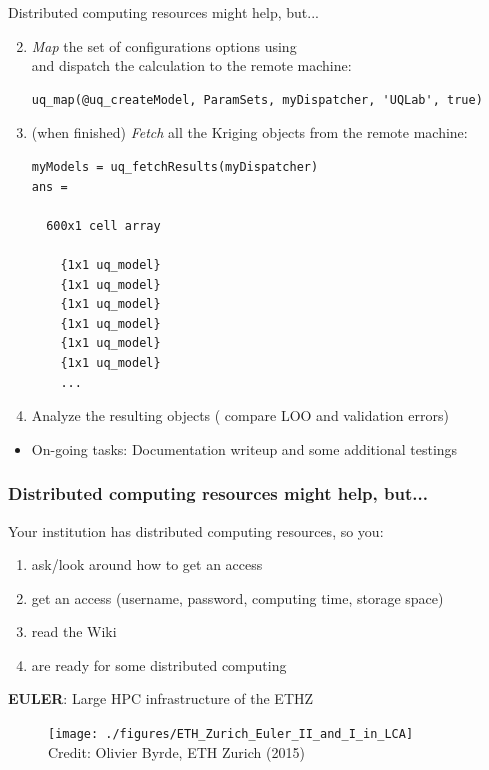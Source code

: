 \documentclass[]{rsuqbeamernew}
\begin{document}
\begin{frame}[fragile]{Distributed computing resources might help, but...}

\begin{enumerate}
  \setcounter{enumi}{1}
  \item \emph{Map} the set of configurations options using \\
         and dispatch the calculation to the remote machine:
\begin{lstlisting}[basicstyle=\scriptsize]
uq_map(@uq_createModel, ParamSets, myDispatcher, 'UQLab', true)
\end{lstlisting}
  \item (when finished) \emph{Fetch} all the Kriging objects from the remote machine:
\begin{lstlisting}[basicstyle=\scriptsize]
myModels = uq_fetchResults(myDispatcher)
ans =

  600x1 cell array

    {1x1 uq_model}
    {1x1 uq_model}
    {1x1 uq_model}
    {1x1 uq_model}
    {1x1 uq_model}
    {1x1 uq_model}
    ...
\end{lstlisting}
  \item Analyze the resulting objects (\eg{,} compare LOO and validation errors)
\end{enumerate}

\begin{itemize}
  \item On-going tasks: Documentation writeup and some additional testings
\end{itemize}

\end{frame}

\begin{frame}
\frametitle{Distributed computing resources might help, but...}
\begin{block}{Your institution has distributed computing resources, so you:}
\begin{enumerate}
  \item ask/look around how to get an access
  \item get an access (username, password, computing time, storage space)
  \item read the Wiki
  \item are ready for some distributed computing 
\end{enumerate}
\end{block}
\begin{block}{\textbf{EULER}: Large HPC infrastructure of the ETHZ}
\begin{figure}[htbp]
  \texttt{[image: ./figures/ETH\_Zurich\_Euler\_II\_and\_I\_in\_LCA]}\\
  {\tiny Credit: Olivier Byrde, ETH Zurich (2015)}
\end{figure}
\end{block}
\end{frame}
\end{document}
